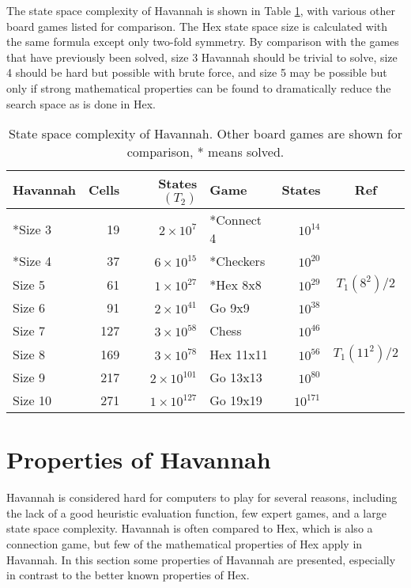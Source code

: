 The state space complexity of Havannah is shown in Table \ref{table:complexity}, with various other board games listed for comparison. The Hex state space size is calculated with the same formula except only two-fold symmetry. By comparison with the games that have previously been solved, size 3 Havannah should be trivial to solve, size 4 should be hard but possible with brute force, and size 5 may be possible but only if strong mathematical properties can be found to dramatically reduce the search space as is done in Hex.

\begin{table}
	\centering
	\begin{tabular}{lrr|lrc}
	Havannah  & Cells & States $(T_2)$      & Game       & States     & Ref \\ \hline
	*Size 3   &    19 & $2 \times 10^{7}$   & *Connect 4 & $10^{14}$  & \cite{trompconnect4} \\
	*Size 4   &    37 & $6 \times 10^{15}$  & *Checkers  & $10^{20}$  & \cite{schaeffer1998solving}\\
	Size 5    &    61 & $1 \times 10^{27}$  & *Hex 8x8   & $10^{29}$  & \cite{henderson2009solving} $T_1(8^2)/2$\\
	Size 6    &    91 & $2 \times 10^{41}$  & Go 9x9     & $10^{38}$  & \cite{tromp2007combinatorics}\\
	Size 7    &   127 & $3 \times 10^{58}$  & Chess      & $10^{46}$  & \cite{tromp2010chess}\\
	Size 8    &   169 & $3 \times 10^{78}$  & Hex 11x11  & $10^{56}$  & $T_1(11^2)/2$\\
	Size 9    &   217 & $2 \times 10^{101}$ & Go 13x13   & $10^{80}$  & \cite{tromp2007combinatorics}\\
	Size 10   &   271 & $1 \times 10^{127}$ & Go 19x19   & $10^{171}$ & \cite{tromp2007combinatorics}\\
	\end{tabular}
	\caption{State space complexity of Havannah. Other board games are shown for comparison, * means solved.}
	\label{table:complexity}
\end{table}

\section{Properties of Havannah}\label{sec:properties}

Havannah is considered hard for computers to play for several reasons, including the lack of a good heuristic evaluation function, few expert games, and a large state space complexity. Havannah is often compared to Hex, which is also a connection game, but few of the mathematical properties of Hex apply in Havannah. In this section some properties of Havannah are presented, especially in contrast to the better known properties of Hex.



